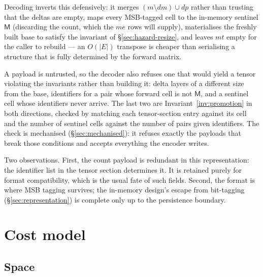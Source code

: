 \documentclass[11pt,a4paper]{article}
\theoremstyle{plain}
\theoremstyle{definition}
\theoremstyle{remark}
\newcommand{\M}{\mathsf{M}}
\begin{document}
Decoding inverts this defensively: it merges $(m \setminus dm) \cup dp$ rather
than trusting that the deltas are empty, maps every MSB-tagged cell to the
in-memory sentinel $\M$ (discarding the count, which the $me$ rows will
supply), materialises the freshly built base to satisfy the invariant of
\S\ref{sec:hazard-resize}, and leaves $mt$ empty for the caller to rebuild
--- an $O(|E|)$ transpose is cheaper than serialising a structure that is
fully determined by the forward matrix.

A payload is untrusted, so the decoder also refuses one that would yield a
tensor violating the invariants rather than building it: delta layers of a
different size from the base, identifiers for a pair whose forward cell is not
$\M$, and a sentinel cell whose identifiers never arrive. The last two are
Invariant~\ref{inv:promotion} in both directions, checked by matching each
tensor-section entry against its cell and the number of sentinel cells against
the number of pairs given identifiers. The check is mechanised
(\S\ref{sec:mechanised}): it refuses exactly the payloads that break those
conditions and accepts everything the encoder writes.

Two observations. First, the count payload is redundant in this
representation: the identifier list in the tensor section determines it. It is
retained purely for format compatibility, which is the usual fate of such
fields. Second, the format is where MSB tagging survives; the in-memory
design's escape from bit-tagging (\S\ref{sec:representation}) is complete
only up to the persistence boundary.

\section{Cost model}
\label{sec:cost}

\subsection{Space}
\end{document}
